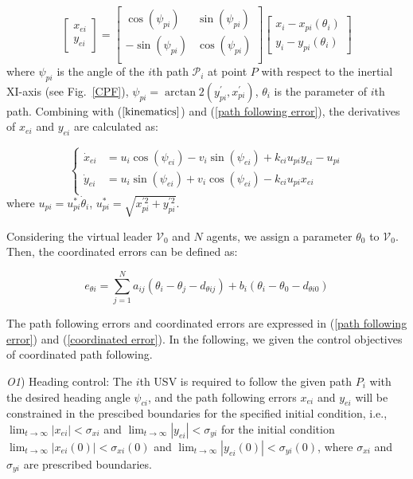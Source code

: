\documentclass[conference,letterpaper,10.5pt]{IEEEtran}
\begin{document}
\begin{equation}\label{path following error}
	\begin{bmatrix}
		x_{ei} \\ y_{ei}
	\end{bmatrix}=
	\begin{bmatrix}
		\cos(\psi_{pi}) & \sin(\psi_{pi})\\
		-\sin(\psi_{pi}) & \cos(\psi_{pi})\\
	\end{bmatrix}
	\begin{bmatrix}
		x_i-x_{pi}(\theta_i) \\ y_i-y_{pi}(\theta_i)
	\end{bmatrix}
\end{equation}
where $\psi_{pi}$ is the angle of the $i$th path $\mathscr{P}_i$ at point $P$ with respect to the inertial XI-axis (see Fig.~\ref{CPF}), $\psi_{pi}=\arctan2(y^{'}_{pi},x^{'}_{pi})$, $\theta_i$ is the parameter of $i$th path. Combining with ($\ref{kinematics}$) and (\ref{path following error}), the derivatives of $x_{ei}$ and $y_{ei}$ are calculated as:

\begin{equation}
	\left\{
	\begin{aligned}
		\dot{x}_{ei}&=u_i\cos(\psi_{ei})-v_i\sin(\psi_{ei})+k_{ci}u_{pi}y_{ei}-u_{pi}\\
		\dot{y}_{ei}&=u_i\sin(\psi_{ei})+v_i\cos(\psi_{ei})-k_{ci}u_{pi}x_{ei}\\
	\end{aligned}
	\right.
\end{equation}
where $u_{pi}=u^*_{pi}\dot{\theta}_i$, $u^*_{pi}=\sqrt{x^{'2}_{pi}+y^{'2}_{pi}}$.

Considering the virtual leader $\mathcal{V}_0$ and $N$ agents, we assign a parameter $\theta_0$ to $\mathcal{V}_0$. Then, the coordinated errors can be defined as:

\begin{equation}\label{coordinated error}
	e_{\theta i}=\sum^N_{j=1}a_{ij}(\theta_i-\theta_j-d_{\theta ij})+b_i(\theta_i-\theta_0-d_{\theta i0})
\end{equation}

The path following errors and coordinated errors are expressed in (\ref{path following error}) and (\ref{coordinated error}). In the following, we given the control objectives of coordinated path following.

\emph{O1}) Heading control: The $i$th USV is required to follow the given path $P_i$ with the desired heading angle $\psi_{ci}$, and the path following errors $x_{ei}$ and $y_{ei}$ will be constrained in the prescibed boundaries for the specified initial condition, i.e., $\lim_{t\to \infty}\left|x_{ei}\right|< \sigma_{xi}$ and $\lim_{t\to \infty}\left|y_{ei}\right|< \sigma_{yi}$ for the initial condition $\lim_{t\to \infty}\left|x_{ei}(0)\right|< \sigma_{xi}(0)$ and $\lim_{t\to \infty}\left|y_{ei}(0)\right|< \sigma_{yi}(0)$, where $\sigma_{xi}$ and $\sigma_{yi}$ are prescribed boundaries.
\end{document}
